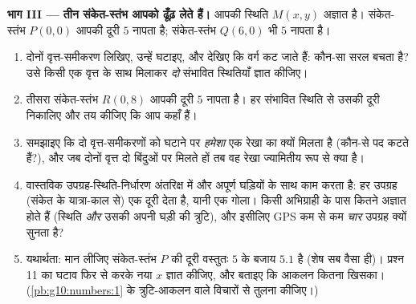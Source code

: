 \begin{problem}
\medskip
\noindent\textbf{भाग III --- तीन संकेत-स्तंभ आपको ढूँढ़ लेते हैं।}
आपकी स्थिति $M(x, y)$ अज्ञात है। संकेत-स्तंभ $P(0, 0)$ आपकी दूरी $5$ नापता है;
संकेत-स्तंभ $Q(6, 0)$ भी $5$ नापता है।
\begin{enumerate}[resume]
  \item दोनों वृत्त-समीकरण लिखिए, उन्हें घटाइए, और देखिए कि वर्ग कट जाते
        हैं: कौन-सा सरल  बचता है? उसे किसी एक वृत्त के साथ मिलाकर
        \emph{दो} संभावित स्थितियाँ ज्ञात कीजिए।
  \item तीसरा संकेत-स्तंभ $R(0, 8)$ आपकी दूरी $5$ नापता है। हर संभावित
        स्थिति से उसकी दूरी निकालिए और तय कीजिए कि आप कहाँ हैं।
  \item समझाइए कि दो वृत्त-समीकरणों को घटाने पर \emph{हमेशा} एक रेखा का
         क्यों मिलता है (कौन-से पद कटते हैं?), और जब दोनों वृत्त
        दो बिंदुओं पर मिलते हों तब वह रेखा ज्यामितीय रूप से क्या है।
  \item वास्तविक उपग्रह-स्थिति-निर्धारण अंतरिक्ष में और अपूर्ण घड़ियों के
        साथ काम करता है: हर उपग्रह (संकेत के यात्रा-काल से) एक दूरी देता
        है, यानी एक गोला। किसी अभिग्राही के पास कितने अज्ञात होते हैं
        (स्थिति \emph{और} उसकी अपनी घड़ी की त्रुटि), और इसीलिए GPS कम से
        कम \emph{चार} उपग्रह क्यों सुनता है?
  \item यथार्थता: मान लीजिए संकेत-स्तंभ $P$ की दूरी वस्तुतः $5$ के
        बजाय $5.1$ है (शेष सब वैसा ही)। प्रश्न 11 का घटाव फिर से करके नया
        $x$ ज्ञात कीजिए, और बताइए कि आकलन कितना खिसका। (\cref{pb:g10:numbers:1} के
        त्रुटि-आकलन वाले विचारों से तुलना कीजिए।)
\end{enumerate}


\end{problem}
